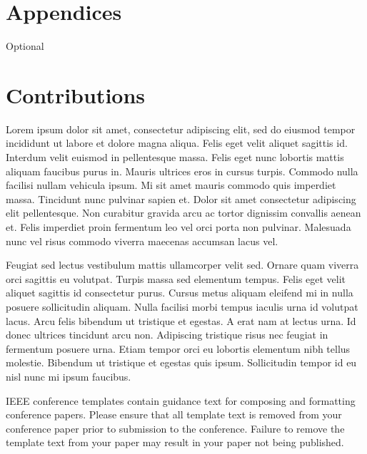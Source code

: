 \documentclass[conference]{IEEEtran}
\begin{document}
\section{Appendices}
Optional

\section{Contributions}
Lorem ipsum dolor sit amet, consectetur adipiscing elit, sed do eiusmod tempor incididunt ut labore et dolore magna aliqua. Felis eget velit aliquet sagittis id. Interdum velit euismod in pellentesque massa. Felis eget nunc lobortis mattis aliquam faucibus purus in. Mauris ultrices eros in cursus turpis. Commodo nulla facilisi nullam vehicula ipsum. Mi sit amet mauris commodo quis imperdiet massa. Tincidunt nunc pulvinar sapien et. Dolor sit amet consectetur adipiscing elit pellentesque. Non curabitur gravida arcu ac tortor dignissim convallis aenean et. Felis imperdiet proin fermentum leo vel orci porta non pulvinar. Malesuada nunc vel risus commodo viverra maecenas accumsan lacus vel.

Feugiat sed lectus vestibulum mattis ullamcorper velit sed. Ornare quam viverra orci sagittis eu volutpat. Turpis massa sed elementum tempus. Felis eget velit aliquet sagittis id consectetur purus. Cursus metus aliquam eleifend mi in nulla posuere sollicitudin aliquam. Nulla facilisi morbi tempus iaculis urna id volutpat lacus. Arcu felis bibendum ut tristique et egestas. A erat nam at lectus urna. Id donec ultrices tincidunt arcu non. Adipiscing tristique risus nec feugiat in fermentum posuere urna. Etiam tempor orci eu lobortis elementum nibh tellus molestie. Bibendum ut tristique et egestas quis ipsum. Sollicitudin tempor id eu nisl nunc mi ipsum faucibus.



\vspace{12pt}
\color{red}
IEEE conference templates contain guidance text for composing and formatting conference papers. Please ensure that all template text is removed from your conference paper prior to submission to the conference. Failure to remove the template text from your paper may result in your paper not being published.
\end{document}
